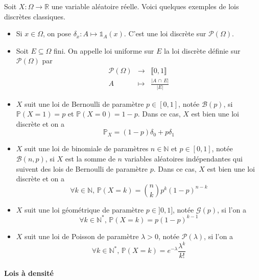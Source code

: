 
  \begin{example}
    \label{261-1}
    Soit $X : \Omega \rightarrow \mathbb{R}$ une variable aléatoire réelle. Voici quelques exemples de lois discrètes classiques.
    \begin{itemize}
      \item \label{261-2} Si $x \in \Omega$, on pose $\delta_x : A \mapsto \mathbb{1}_A(x)$. C'est une loi discrète sur $\mathcal{P}(\Omega)$.
      \item Soit $E \subseteq \Omega$ fini. On appelle loi uniforme sur $E$ la loi discrète définie sur $\mathcal{P}(\Omega)$ par
      \[
      \begin{array}{ccc}
        \mathcal{P}(\Omega) &\rightarrow& \llbracket 0, 1 \rrbracket \\
        A &\mapsto& \frac{\vert A \, \cap \, E \vert}{\vert E \vert}
      \end{array}
      \]
      \item $X$ suit une loi de Bernoulli de paramètre $p \in [0,1]$, notée $\mathcal{B}(p)$, si $\mathbb{P}(X=1) = p$ et $\mathbb{P}(X=0)=1-p$. Dans ce cas, $X$ est bien une loi discrète et on a
      \[ \mathbb{P}_X = (1-p) \delta_0 + p \delta_1 \]
      \item $X$ suit une loi de binomiale de paramètres $n \in \mathbb{N}$ et $p \in [0,1]$, notée $\mathcal{B}(n, p)$, si $X$ est la somme de $n$ variables aléatoires indépendantes qui suivent des lois de Bernoulli de paramètre $p$. Dans ce cas, $X$ est bien une loi discrète et on a
      \[ \forall k \in \mathbb{N}, \, \mathbb{P}(X = k) = \binom{n}{k} p^k (1-p)^{n-k} \]
      \item $X$ suit une loi géométrique de paramètre $p \in ]0,1]$, notée $\mathcal{G}(p)$, si l'on a
      \[ \forall k \in \mathbb{N}^{*}, \, \mathbb{P}(X = k) = p(1-p)^{k-1} \]
      \item $X$ suit une loi de Poisson de paramètre $\lambda > 0$, notée $\mathcal{P}(\lambda)$, si l'on a
      \[ \forall k \in \mathbb{N}^{*}, \, \mathbb{P}(X = k) = e^{-\lambda} \frac{\lambda^k}{k!} \]
    \end{itemize}
  \end{example}

  \paragraph{Lois à densité}


